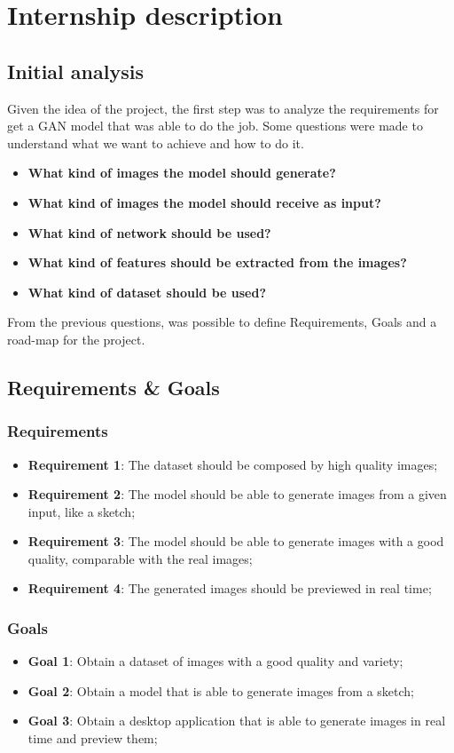 \chapter{Internship description}\label{cap:internship-desc}
\section{Initial analysis}
Given the idea of the project, the first step was to analyze the requirements for get a GAN model that was able to do the job.
Some questions were made to understand what we want to achieve and how to do it.
\begin{itemize}
    \item\textbf{What kind of images the model should generate?}
    \item\textbf{What kind of images the model should receive as input?}
    \item\textbf{What kind of network should be used?}
    \item\textbf{What kind of features should be extracted from the images?}
    \item\textbf{What kind of dataset should be used?}
\end{itemize}
From the previous questions, was possible to define Requirements, Goals and a road-map for the project.\\
\section{Requirements \& Goals}
\subsection{Requirements}
\begin{itemize}
    \item \textbf{Requirement 1}: The dataset should be composed by high quality images;
    \item \textbf{Requirement 2}: The model should be able to generate images from a given input, like a sketch;
    \item \textbf{Requirement 3}: The model should be able to generate images with a good quality, comparable with the real images;
    \item \textbf{Requirement 4}: The generated images should be previewed in real time;
\end{itemize}
\subsection{Goals}
\begin{itemize}
    \item \textbf{Goal 1}: Obtain a dataset of images with a good quality and variety;
    \item \textbf{Goal 2}: Obtain a model that is able to generate images from a sketch;
    \item \textbf{Goal 3}: Obtain a desktop application that is able to generate images in real time and preview them;
\end{itemize}
